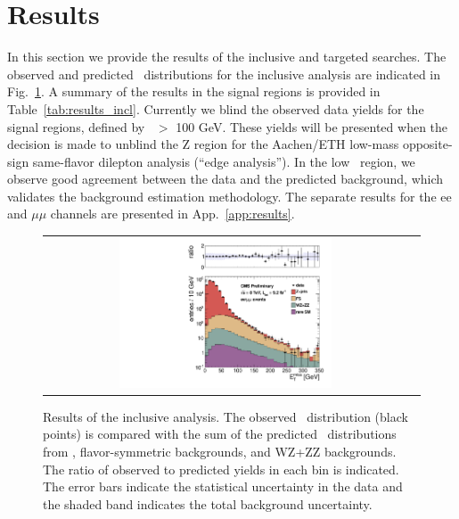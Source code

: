 \clearpage

\section{Results}

In this section we provide the results of the inclusive and targeted searches. The observed and predicted \MET\ distributions for the
inclusive analysis are indicated in Fig.~\ref{fig:results_incl}. A summary of the results in the signal regions is provided in
Table~\ref{tab:results_incl}. Currently we blind the observed data yields for the signal regions, defined by \MET\ $>$ 100 GeV.
These yields will be presented when the decision is made to unblind the Z region for the Aachen/ETH low-mass opposite-sign same-flavor
dilepton analysis (``edge analysis''). In the low \MET\ region, we observe good agreement between the data and the predicted background,
which validates the background estimation methodology.
The separate results for the ee and $\mu\mu$ channels are presented in App.~\ref{app:results}.

\begin{figure}[!h]
\begin{center}
\begin{tabular}{cc}
\includegraphics[width=0.6\textwidth]{plots/pfmet_all.pdf}
\end{tabular}
\caption{Results of the inclusive analysis. The observed \MET\ distribution (black points) is compared with the sum of the predicted \MET\
distributions from \zjets, flavor-symmetric backgrounds, and WZ+ZZ backgrounds. The ratio of observed to predicted yields in each bin is
indicated. The error bars indicate the statistical uncertainty in the data and the shaded band indicates the total background uncertainty.
\label{fig:results_incl}
}
\end{center}
\end{figure}



